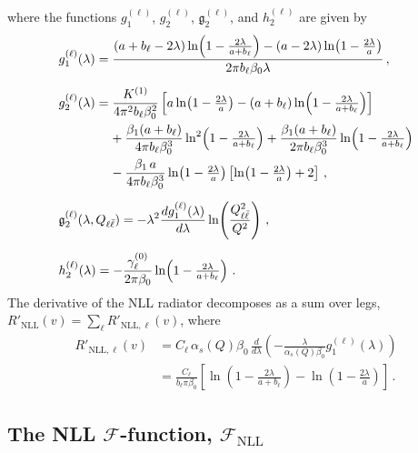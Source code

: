 where the functions $g_1^{(\ell)}$, $g_2^{(\ell)}$, $\mathfrak{g}_2^{(\ell)}$, and $h_2^{(\ell)}$ are given by
\begin{subequations}
\label{eq:RNLL-g-h}
\begin{align}
&g_1^{(\ell)}(\lambda) = \frac{(a+b_\ell-2\lambda)\ln\!\left(1-\tfrac{2\lambda}{a+b_\ell}\right)-(a-2\lambda)\ln\!\left(1-\tfrac{2\lambda}{a}\right)}{2\pi b_\ell\beta_0\lambda}\,, \label{eq:g1}\\[6pt]
&g_2^{(\ell)}(\lambda) = \frac{K^{(1)}}{4\pi^2 b_\ell\beta_0^2}\left[a\ln\!\left(1-\tfrac{2\lambda}{a}\right)-(a+b_\ell)\ln\!\left(1-\tfrac{2\lambda}{a+b_\ell}\right)\right] \notag\\
&\qquad\qquad +\frac{\beta_1(a+b_\ell)}{4\pi b_\ell\beta_0^3}\ln^2\!\left(1-\tfrac{2\lambda}{a+b_\ell}\right) +\frac{\beta_1(a+b_\ell)}{2\pi b_\ell\beta_0^3}\ln\!\left(1-\tfrac{2\lambda}{a+b_\ell}\right) \notag\\
&\qquad\qquad -\frac{\beta_1\,a}{4\pi b_\ell\beta_0^3}\ln\!\left(1-\tfrac{2\lambda}{a}\right)\left[\ln\!\left(1-\tfrac{2\lambda}{a}\right)+2\right]\,, \label{eq:g2}\\[6pt]
&\mathfrak{g}_2^{(\ell)}(\lambda,Q_{\ell\bar\ell}) = -\lambda^2\frac{dg_1^{(\ell)}(\lambda)}{d\lambda}\ln\!\left(\frac{Q_{\ell\bar\ell}^2}{Q^2}\right)\,, \label{eq:g2frak}\\[6pt]
&h_2^{(\ell)}(\lambda) = -\frac{\gamma_\ell^{(0)}}{2\pi\beta_0}\ln\!\left(1-\tfrac{2\lambda}{a+b_\ell}\right)\,. \label{eq:h2}
\end{align}
\end{subequations}
The derivative of the NLL radiator decomposes as a sum over legs,
$R'_{\mathrm{NLL}}(v) = \sum_\ell R'_{\mathrm{NLL},\ell}(v)$, where
\begin{equation}
\label{eq:RpNLL}
  \begin{split}
    R'_{\mathrm{NLL},\ell}(v) &= C_\ell\,\alpha_s(Q)\beta_0\,
      \frac{d}{d\lambda}\!\left(
        -\frac{\lambda}{\alpha_s(Q)\beta_0}
        g_1^{(\ell)}(\lambda)\right)\\[1ex]
    &= \frac{C_\ell}{b_{\ell}\pi\beta_0}
      \left[\ln\!\left(1-\frac{2\lambda}{a+b_{\ell}}\right)
           -\ln\!\left(1-\frac{2\lambda}{a}\right)\right]\,.
  \end{split}
\end{equation}

\subsection{The NLL $\mathcal{F}$-function, $\mathcal{F}_{\mathrm{NLL}}$}
\label{subsec:FNLL}

